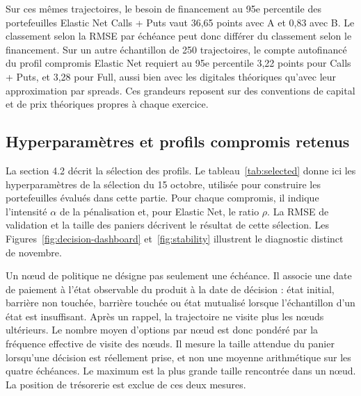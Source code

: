 Sur ces mêmes trajectoires, le besoin de financement au 95e percentile des portefeuilles Elastic Net Calls + Puts vaut 36,65 points avec A et 0,83 avec B. Le classement selon la RMSE par échéance peut donc différer du classement selon le financement. Sur un autre échantillon de 250 trajectoires, le compte autofinancé du profil compromis Elastic Net requiert au 95e percentile 3,22 points pour Calls + Puts, et 3,28 pour Full, aussi bien avec les digitales théoriques qu'avec leur approximation par spreads. Ces grandeurs reposent sur des conventions de capital et de prix théoriques propres à chaque exercice.

\subsection{Hyperparamètres et profils compromis retenus}

La section 4.2 décrit la sélection des profils. Le tableau~\ref{tab:selected} donne ici les hyperparamètres de la sélection du 15 octobre, utilisée pour construire les portefeuilles évalués dans cette partie. Pour chaque compromis, il indique l'intensité $\alpha$ de la pénalisation et, pour Elastic Net, le ratio $\rho$. La RMSE de validation et la taille des paniers décrivent le résultat de cette sélection. Les Figures~\ref{fig:decision-dashboard} et~\ref{fig:stability} illustrent le diagnostic distinct de novembre.

Un nœud de politique ne désigne pas seulement une échéance. Il associe une date de paiement à l'état observable du produit à la date de décision : état initial, barrière non touchée, barrière touchée ou état mutualisé lorsque l'échantillon d'un état est insuffisant. Après un rappel, la trajectoire ne visite plus les nœuds ultérieurs. Le nombre moyen d'options par nœud est donc pondéré par la fréquence effective de visite des nœuds. Il mesure la taille attendue du panier lorsqu'une décision est réellement prise, et non une moyenne arithmétique sur les quatre échéances. Le maximum est la plus grande taille rencontrée dans un nœud. La position de trésorerie est exclue de ces deux mesures.

